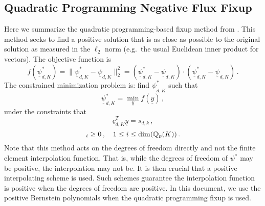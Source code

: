 \documentclass[../doc.tex]{subfiles}
\begin{document}
\subsection{Quadratic Programming Negative Flux Fixup}
Here we summarize the quadratic programming-based fixup method from \textcite{YEE2020109696}. This method seeks to find a positive solution that is as close as possible to the original solution as measured in the $\ell_2$ norm (e.g.~the usual Euclidean inner product for vectors). The objective function is 
	\begin{equation}
		f(\underline{\psi}_{d,K}^*) = \| \underline{\psi}_{d,K}^* - \underline{\psi}_{d,K} \|_2^2 = (\underline{\psi}_{d,K}^* - \underline{\psi}_{d,K}) \cdot (\underline{\psi}_{d,K}^* - \underline{\psi}_{d,K}) \,. 
	\end{equation}
The constrained minimization problem is: find $\underline{\psi}_{d,K}^*$ such that 
	\begin{equation}
		\underline{\psi}_{d,K}^* = \min_{\underline{y}} f(\underline{y}) \,, 
	\end{equation}
under the constraints that 
	\begin{equation}
		\underline{c}_{d,K}^T \underline{y} = s_{d,k} \,,
	\end{equation}
	\begin{equation}
		[\underline{y}]_i \geq 0 \,, \quad 1 \leq i \leq \dim(\Qbb{p}(K)) \,. 
	\end{equation}
Note that this method acts on the degrees of freedom directly and not the finite element interpolation function. That is, while the degrees of freedom of $\psi^*$ may be positive, the interpolation may not be. It is then crucial that a positive interpolating scheme is used. Such schemes guarantee the interpolation function is positive when the degrees of freedom are positive. In this document, we use the positive Bernstein polynomials \cite{doi:10.1137/11082539X} when the quadratic programming fixup is used. 
\end{document}
